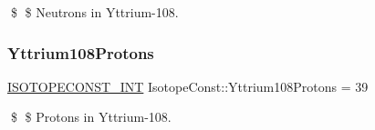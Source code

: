 \$ \$ Neutrons in Yttrium-\/108. \mbox{\label{group___isotope_const-_yttrium-_y108_ga04a8c2d1a5eb8253fa44bb167034a2e6}} 
\subsubsection{\texorpdfstring{Yttrium108\+Protons}{Yttrium108Protons}}
{\footnotesize\ttfamily \mbox{\hyperlink{group___isotope_const-_macros_ga5f18360b3e99483a35c32d789e62621c}{I\+S\+O\+T\+O\+P\+E\+C\+O\+N\+S\+T\+\_\+\+I\+NT}} Isotope\+Const\+::\+Yttrium108\+Protons = 39}

\$ \$ Protons in Yttrium-\/108. 